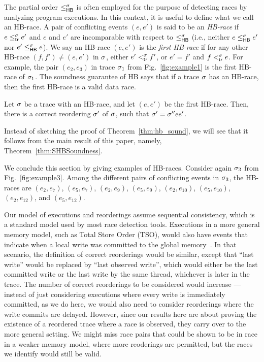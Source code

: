 The partial order $\leq^{\sigma}_{\mathsf{HB}}$ is often employed for the purpose of
detecting races by analyzing program executions. In this context, it
is useful to define what we call an HB-race. A pair of conflicting events
$(e,e')$ is said to be an \emph{HB-race} if $e \leq^{\sigma}_{\mathsf{tr}} e'$ and $e$
and $e'$ are incomparable with respect to $\leq^{\sigma}_{\mathsf{HB}}$ (i.e., neither
$e \leq^{\sigma}_{\mathsf{HB}} e'$ nor $e' \leq^{\sigma}_{\mathsf{HB}} e$). We say an HB-race $(e,e')$ is
the \emph{first HB-race} if for any other HB-race $(f,f') \neq
(e,e')$ in $\sigma$, either $e' <^{\sigma}_{\mathsf{tr}} f'$, or $e' = f'$ and
$f <^{\sigma}_{\mathsf{tr}} e$. 
For example, the pair $(e_2, e_3)$ in trace $\sigma_1$ from Fig.~\ref{fig:example1} 
is the first HB-race of $\sigma_1$.
The soundness guarantee of HB says that if a
trace $\sigma$ has an HB-race, then the first HB-race is a valid data
race.
%
\begin{theorem}[Soundness of HB]
\label{thm:hb_sound}
Let $\sigma$ be a trace with an HB-race, and let $(e, e')$ be the first
HB-race.  Then, there is a correct reordering $\sigma'$ of $\sigma$, such
that $\sigma' = \sigma'' e e'$.
\end{theorem}
%
Instead of sketching the proof of Theorem~\ref{thm:hb_sound}, we will
see that it follows from the main result of this paper, namely,
Theorem~\ref{thm:SHBSoundness}.

\begin{example}
\label{ex:hb-race}
We conclude this section by giving examples of HB-races. Consider
again $\sigma_3$ from Fig.~\ref{fig:example3}. Among the different pairs
of conflicting events in $\sigma_3$, the HB-races are $(e_2,e_7)$,
$(e_5,e_7)$, $(e_2,e_9)$, $(e_5,e_9)$, $(e_2,e_{10})$, $(e_5,e_{10})$,
$(e_2,e_{12})$, and $(e_5,e_{12})$.
\end{example}

\begin{remark}
Our model of executions and reorderings assume sequential consistency,
which is a standard model used by most race detection
tools. Executions in a more general memory model, such as 
Total Store Order (TSO),  would also have events that indicate when
 a local write was committed to the global
memory~\cite{HuangTSO16}. In that scenario,
the definition of correct reorderings would be similar, except that
``last write'' would be replaced by ``last observed write'', which
would either be the last committed write or the last write by the same
thread, whichever is later in the trace. The number of correct
reorderings to be considered would increase --- instead of just
considering executions where every write is immediately committed, as
we do here, we would also need to consider reorderings where the write
commits are delayed. However, since our results here are about proving
the existence of a reordered trace where a race is observed, they
carry over to the more general setting. We might miss race pairs that
could be shown to be in race in a weaker memory model, where more
reoderings are permitted, but the races we identify would still be
valid.
\end{remark}
